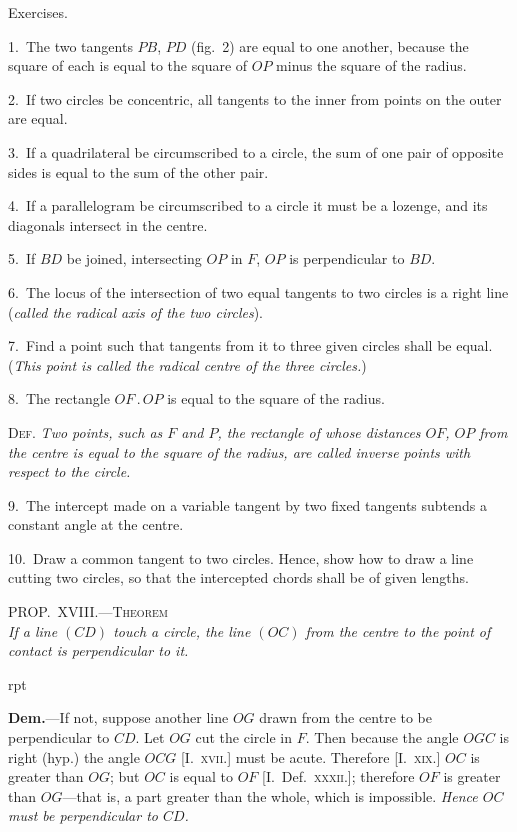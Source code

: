 \documentclass[oneside]{book}
\newcounter{wrapwidth}
\newcommand\myprop[2]{
\bigskip\Needspace*{4\baselineskip}\begin{center}\textsc{#1}\\\medskip\emph{#2}\par\end{center}
}
\newcommand\exhead[1]{
\Needspace*{5\baselineskip}\begin{center}
\textsf{#1}
\end{center}
}
\newcommand\imgflow[3]{
\setcounter{wrapwidth}{#1}

\begin{wrapfigure}[#2]{r}{\value{wrapwidth}pt}
\begin{center}
\vspace{-0.3in}

\end{center}
\end{wrapfigure}
}
\begin{document}
\exhead{Exercises.}

\begin{footnotesize}
1.~The two tangents $PB$, $PD$ (fig.~2) are equal to one another,
because the square of each is equal to the square of $OP$ minus the
square of the radius.

2.~If two circles be concentric, all tangents to the inner from
points on the outer are equal.

3.~If a quadrilateral be circumscribed to a circle, the sum
of one pair of opposite sides is equal to the sum of the other
pair.

4.~If a parallelogram be circumscribed to a circle it must be
a lozenge, and its diagonals intersect in the centre.

5.~If $BD$ be joined, intersecting $OP$ in $F$, $OP$ is perpendicular
to $BD$.

6.~The locus of the intersection of two equal tangents to two
circles is a right line (\emph{called the radical axis of the two circles}).

7.~Find a point such that tangents from it to three given circles
shall be equal. (\emph{This point is called the radical centre of the three
circles.})

8.~The rectangle $OF\,.\,OP$ is equal to the square of the radius.

\textsc{Def.} \emph{Two points, such as $F$ and $P$, the rectangle of whose
distances $OF$, $OP$ from the centre is equal to the square of the
radius, are called inverse points with respect to the circle.}

9.~The intercept made on a variable tangent by two fixed tangents
subtends a constant angle at the centre.

10.~Draw a common tangent to two circles. Hence, show how
to draw a line cutting two circles, so that the intercepted chords
shall be of given lengths.
\par\end{footnotesize}


\myprop{PROP\@.~XVIII\@.---Theorem}{If a line $(CD)$ touch a circle, the line $(OC)$ from the centre
to the point of contact is perpendicular to it.}


\imgflow{135}{11}{f124}

\textbf{Dem.}---If not, suppose another line $OG$ drawn from
the centre to be perpendicular
to $CD$. Let $OG$ cut the
circle in $F$. Then because
the angle $OGC$ is right (hyp.)
the angle $OCG$ [I.~\textsc{xvii.}]
must be acute. Therefore
[I.~\textsc{xix.}] $OC$ is greater than
$OG$; but $OC$ is equal to $OF$
[I.~Def.~\textsc{xxxii.}]; therefore
$OF$ is greater than $OG$---that
is, a part greater than the
whole, which is impossible. \emph{Hence $OC$ must be perpendicular
to $CD$.}\par\smallskip
\end{document}
